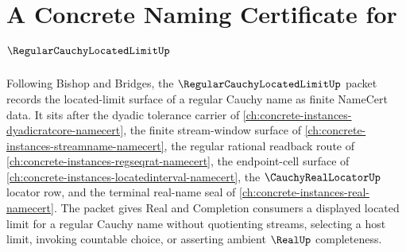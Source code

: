\chapter{A Concrete Naming Certificate for $\RegularCauchyLocatedLimitUp$}
\label{ch:concrete-instances-regular-cauchy-located-limit-namecert}

Following Bishop and Bridges, the $\RegularCauchyLocatedLimitUp$ packet records the located-limit surface of a regular Cauchy name as finite NameCert data. It sits after the dyadic tolerance carrier of \autoref{ch:concrete-instances-dyadicratcore-namecert}, the finite stream-window surface of \autoref{ch:concrete-instances-streamname-namecert}, the regular rational readback route of \autoref{ch:concrete-instances-regseqrat-namecert}, the endpoint-cell surface of \autoref{ch:concrete-instances-locatedinterval-namecert}, the $\CauchyRealLocatorUp$ locator row, and the terminal real-name seal of \autoref{ch:concrete-instances-real-namecert}. The packet gives Real and Completion consumers a displayed located limit for a regular Cauchy name without quotienting streams, selecting a host limit, invoking countable choice, or asserting ambient $\RealUp$ completeness.

